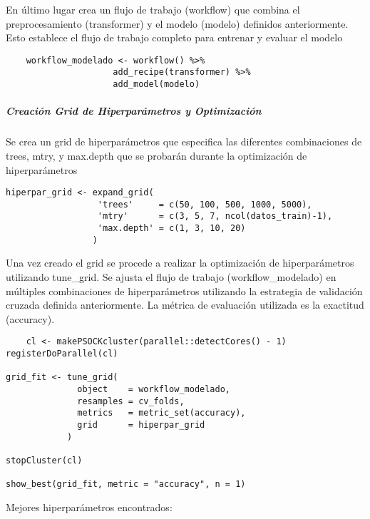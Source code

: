 En último lugar crea un flujo de trabajo (workflow) que combina el preprocesamiento (transformer) y el modelo (modelo) definidos anteriormente. Esto establece el flujo de trabajo completo para entrenar y evaluar el modelo

\begin{lstlisting}
    workflow_modelado <- workflow() %>%
                     add_recipe(transformer) %>%
                     add_model(modelo)
\end{lstlisting}

\subparagraph{Creación Grid de Hiperparámetros y Optimización}

Se crea un grid de hiperparámetros que especifica las diferentes combinaciones de trees, mtry, y max.depth que se probarán durante la optimización de hiperparámetros

\begin{lstlisting}[style=mystyle]
    hiperpar_grid <- expand_grid(
                  'trees'     = c(50, 100, 500, 1000, 5000),
                  'mtry'      = c(3, 5, 7, ncol(datos_train)-1),
                  'max.depth' = c(1, 3, 10, 20)
                 )
\end{lstlisting}

Una vez creado el grid se procede a realizar la optimización de hiperparámetros utilizando tune\_grid. Se ajusta el flujo de trabajo (workflow\_modelado) en múltiples combinaciones de hiperparámetros utilizando la estrategia de validación cruzada definida anteriormente. La métrica de evaluación utilizada es la exactitud (accuracy). 

\begin{lstlisting}
    cl <- makePSOCKcluster(parallel::detectCores() - 1)
registerDoParallel(cl)

grid_fit <- tune_grid(
              object    = workflow_modelado,
              resamples = cv_folds,
              metrics   = metric_set(accuracy),
              grid      = hiperpar_grid
            )

stopCluster(cl)

show_best(grid_fit, metric = "accuracy", n = 1)
\end{lstlisting}

Mejores hiperparámetros encontrados:

